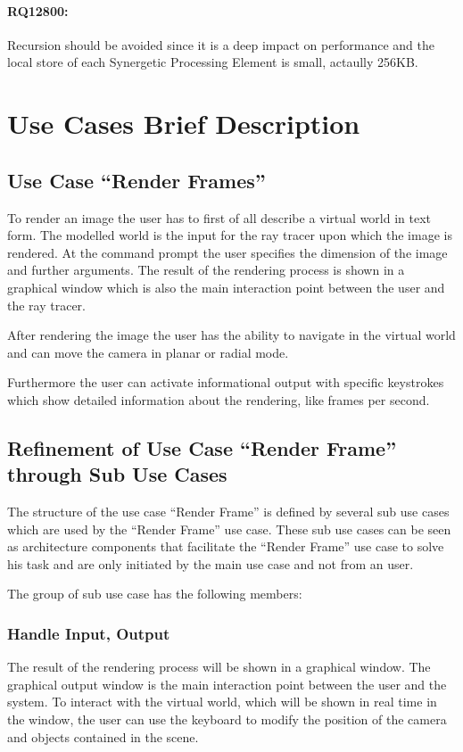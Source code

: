 \documentclass[DIV10, abstracton, openright, footsepline, headsepline, twoside, 9pt,
bigheadings]{scrreprt}
\begin{document}
\paragraph{RQ12800:} Recursion should be avoided since it is a
deep impact on performance and the local store of each Synergetic Processing Element
is small, actaully 256KB.

\newpage
\section{Use Cases Brief Description}

\subsection{Use Case ``Render Frames''}
To render an image the user has to  first of all describe a virtual world in text form.
The modelled world is the input for the ray tracer upon which the image is rendered.
At the command prompt the user specifies the dimension of the image and further
 arguments. The result of the rendering process is shown in
a graphical window which is also the main interaction point between the user and the
ray tracer.

After rendering the image the user has the ability to navigate in the virtual world
and can move the camera in planar or radial mode.

Furthermore the user can activate informational output with specific keystrokes
which show detailed information about the rendering, like frames per second.


\subsection{Refinement of Use Case ``Render Frame'' through Sub Use Cases}
The structure of the use case ``Render Frame'' is defined by several
sub use cases which are used by the ``Render Frame'' use case. These sub use cases can be seen as architecture components that facilitate
the ``Render Frame'' use case to solve his task and are only initiated by the main
use case and not from an user.

The group of sub use case has the following members:
\subsubsection*{Handle Input, Output}
The result of the rendering process will be shown in a graphical window.
The graphical output window is the main interaction point between the user and the
system. To interact with the virtual world, which will be shown in real time in the
window, the user can use the keyboard to modify the position of the camera and
objects contained in the scene.
\end{document}
